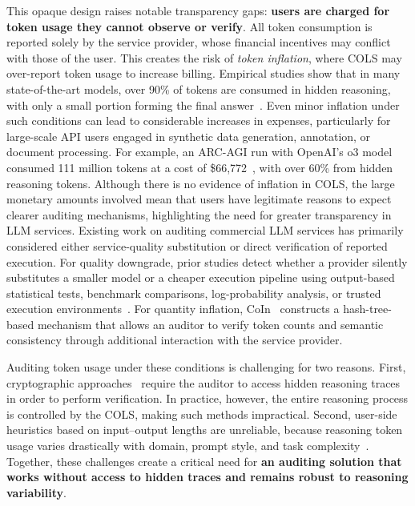 \documentclass[pdflatex,sn-mathphys-num]{sn-jnl}%
\theoremstyle{thmstyleone}%
\theoremstyle{thmstyletwo}%
\theoremstyle{thmstylethree}%
\begin{document}
This opaque design raises notable transparency gaps: \textbf{users are charged for token usage they cannot observe or verify}. All token consumption is reported solely by the service provider, whose financial incentives may conflict with those of the user. This creates the risk of \textit{token inflation}, where COLS may over-report token usage to increase billing. 
Empirical studies show that in many state-of-the-art models, over 90\% of tokens are consumed in hidden reasoning, with only a small portion forming the final answer~\citep{sun2025coin}. Even minor inflation under such conditions can lead to considerable increases in expenses, particularly for large-scale API users engaged in synthetic data generation, annotation, or document processing. 
For example, an ARC-AGI run with OpenAI's o3 model consumed 111 million tokens at a cost of \$66,772~\citep{chollet2025o3}, with over 60\% from hidden reasoning tokens. Although there is no evidence of inflation in COLS, the large monetary amounts involved mean that users have legitimate reasons to expect clearer auditing mechanisms, highlighting the need for greater transparency in LLM services. Existing work on auditing commercial LLM services has primarily considered either service-quality substitution or direct verification of reported execution. For quality downgrade, prior studies detect whether a provider silently substitutes a smaller model or a cheaper execution pipeline using output-based statistical tests, benchmark comparisons, log-probability analysis, or trusted execution environments~\citep{cai2025you,yuan2025trust,nvidia2023confidential}. For quantity inflation, CoIn~\citep{sun2025coin} constructs a hash-tree-based mechanism that allows an auditor to verify token counts and semantic consistency through
additional interaction with the service provider.

Auditing token usage under these conditions is challenging for two reasons. First, cryptographic approaches~\citep{sun2025coin} require the auditor to access hidden reasoning traces in order to perform verification. In practice, however, the entire reasoning process is controlled by the COLS, making such methods impractical. Second, user-side heuristics based on input–output lengths are unreliable, because reasoning token usage varies drastically with domain, prompt style, and task complexity~\citep{jin2024impact}. Together, these challenges create a critical need for \textbf{an auditing solution that works without access to hidden traces and remains robust to reasoning variability}.
\end{document}
